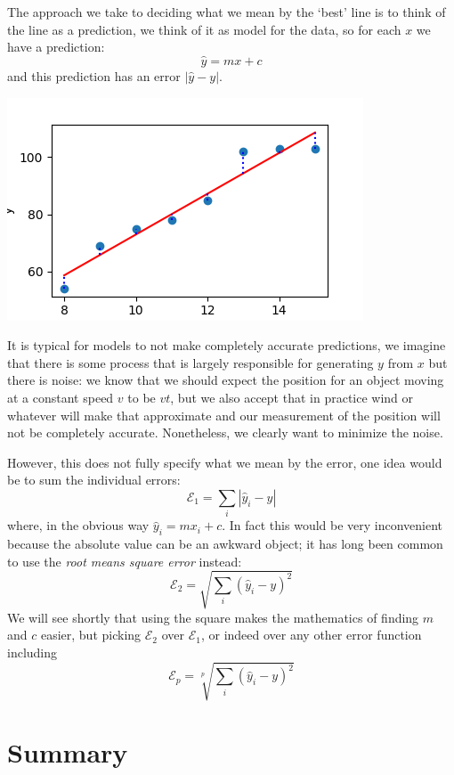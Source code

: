 \documentclass[12pt]{article}
\begin{document}
The approach we take to deciding what we mean by the `best' line is to
think of the line as a prediction, we think of it as model for the
data, so for each $x$ we have a prediction:
\begin{equation}
  \hat{y}=mx+c
\end{equation}
and this prediction has an error $|\hat{y}-y|$.
\begin{center}
  \includegraphics[]{02.3_points_line.png}
  \end{center}
It is typical for models to not make completely accurate predictions,
we imagine that there is some process that is largely responsible for
generating $y$ from $x$ but there is noise: we know that we should
expect the position for an object moving at a constant speed $v$ to be
$vt$, but we also accept that in practice wind or whatever will make
that approximate and our measurement of the position will not be
completely accurate. Nonetheless, we clearly want to minimize the
noise.

However, this does not fully specify what we mean by the error, one
idea would be to sum the individual errors:
\begin{equation}
  \mathcal{E}_1=\sum_i |\hat{y}_i-y|
\end{equation}
where, in the obvious way $\hat{y}_i=mx_i+c$. In fact this would be
very inconvenient because the absolute value can be an awkward object; it has long been common to use the \textsl{root means square error} instead:
\begin{equation}
  \mathcal{E}_2=\sqrt{\sum_i (\hat{y}_i-y)^2}
\end{equation}
We will see shortly that using the square makes the mathematics of
finding $m$ and $c$ easier, but picking $\mathcal{E}_2$ over
$\mathcal{E}_1$, or indeed over any other error function including
\begin{equation}
  \mathcal{E}_p=\sqrt[p]{\sum_i (\hat{y}_i-y)^2}
\end{equation}




\section*{Summary}
\end{document}

